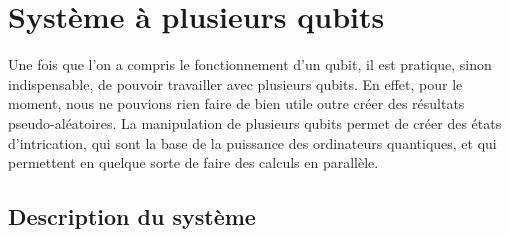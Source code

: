\chapter{Système à plusieurs qubits}\label{ch:systeme-a-plusieurs-qubits}

Une fois que l'on a compris le fonctionnement d'un qubit, il est pratique,
sinon indispensable, de pouvoir travailler avec plusieurs qubits.
En effet, pour le moment, nous ne pouvions rien faire de bien utile outre
créer des résultats pseudo-aléatoires.
La manipulation de plusieurs qubits permet de créer des états d'intrication,
qui sont la base de la puissance des ordinateurs quantiques, et qui permettent
en quelque sorte de faire des calculs en parallèle.

\section{Description du système}\label{sec:description-du-systeme}

